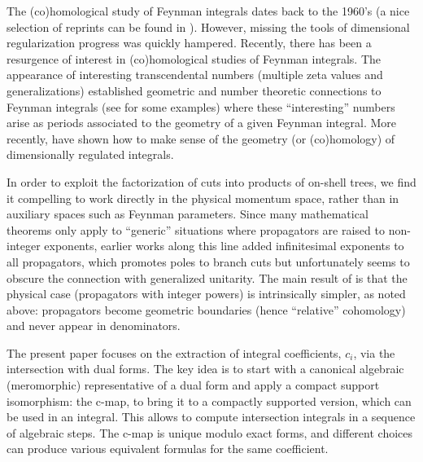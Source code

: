 \documentclass[11pt]{article}
\begin{document}
The (co)homological study of Feynman integrals dates back to the 1960's (a nice selection of reprints can be found in \cite{Hwa:102287}). 
However, missing the tools of dimensional regularization \cite{THOOFT1972189} progress was quickly hampered. 
Recently, there has been a resurgence of interest in (co)homological studies of Feynman integrals. 
The appearance of interesting transcendental numbers (multiple zeta values and generalizations)
established geometric and number theoretic connections to Feynman integrals (see  \cite{Broadhurst:1985vq, Broadhurst:1996ye, Broadhurst:1996yd, Bloch:2005bh, Brown:2009rc, Brown:2009ta, Bonisch:2021yfw, Broedel:2021zij} for some examples) where these ``interesting'' numbers arise as periods associated to the
geometry of a given Feynman integral.  
More recently, \cite{Mastrolia:2018uzb, Frellesvig:2019kgj, Frellesvig:2019uqt,  Mizera:2019vvs, Mizera:2020wdt, Frellesvig:2020qot} have shown how to make sense of the geometry (or (co)homology) of dimensionally regulated integrals. 

In order to exploit the factorization of cuts into products of on-shell trees, we find it compelling to work directly in the physical momentum space,
rather than in auxiliary spaces such as Feynman parameters.
Since many mathematical theorems only apply to ``generic'' situations where propagators are raised to non-integer exponents, earlier works along this line \cite{Mastrolia:2018uzb, Frellesvig:2019kgj, Frellesvig:2019uqt, Mizera:2019vvs, Mizera:2020wdt, Frellesvig:2020qot} added infinitesimal exponents to all propagators, which promotes poles to branch cuts but unfortunately seems to obscure the connection with generalized unitarity.
The main result of \cite{Caron-Huot:2021xqj} is that the physical case (propagators with integer powers) is intrinsically simpler, as noted above:
propagators become geometric boundaries (hence ``relative'' cohomology) and never appear in denominators.


The present paper focuses on the extraction of integral coefficients, $c_i$, via the intersection with dual forms. 
The key idea is to start with a canonical algebraic (meromorphic) representative of a dual form and apply
a compact support isomorphism: the c-map, to bring it to a compactly supported version, which can be used in an integral.
This allows to compute intersection integrals in a sequence of algebraic steps.  
The c-map is unique modulo exact forms, and different choices
can produce various equivalent formulas for the same coefficient.
\end{document}
